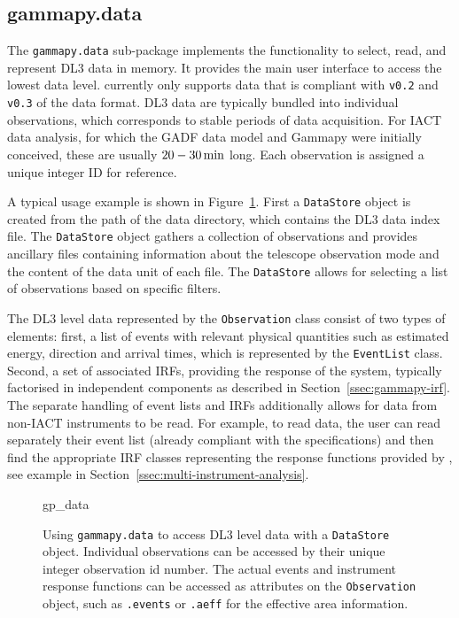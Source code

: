 \documentclass[traditabstract, longauth]{aa}
\newcommand{\code}[1]{\texttt{#1}}
\begin{document}
\subsection{gammapy.data}
\label{ssec:gammapy-data}
The \code{gammapy.data} sub-package implements the functionality to select,
read, and represent DL3 \gammaray data in memory. It provides the main user
interface to access the lowest data level. \gammapy currently only
supports data that is compliant with \code{v0.2} and \code{v0.3} of the \gadf data format.
DL3 data are typically bundled into individual observations, which
corresponds to stable periods of data acquisition. For IACT data analysis,
for which the GADF data model and Gammapy were initially conceived,
these are usually $20 - 30\,{\rm min}$ long.
Each observation is assigned a unique integer ID for reference.

A typical usage example is shown in Figure~\ref{fig*:minted:gp_data}.
First a \code{DataStore} object is created from the path of the data
directory, which contains the DL3 data index file. The \code{DataStore}
object gathers a collection of observations and provides ancillary
files containing information about the telescope observation mode and the
content of the data unit of each file. The \code{DataStore} allows for
selecting a list of observations based on specific filters.

The DL3 level data represented by the \code{Observation} class consist
of two types of elements: first, a list of \gammaray events with relevant physical
quantities such as estimated energy, direction and arrival
times, which is represented by the \code{EventList} class. Second, a set of
associated IRFs, providing the response of the system, typically
factorised in independent components as described in
Section~\ref{ssec:gammapy-irf}. The separate handling of event lists and IRFs
additionally allows for data from non-IACT \gammaray instruments to be read. For
example, to read \fermi data, the user can read separately their event list
(already compliant with the \gadf specifications) and then find the appropriate
IRF classes representing the response functions provided by \fermi, see
example in Section~\ref{ssec:multi-instrument-analysis}.

\begin{figure}
	\small
	{gp_data}
	\caption{
        Using \code{gammapy.data} to access DL3 level data with a \code{DataStore} object.
        Individual observations can be accessed by their unique integer observation id number.
        The actual events and instrument response functions can be accessed
        as attributes on the \code{Observation} object, such as \code{.events}
        or \code{.aeff} for the effective area information.
    }
	\label{fig*:minted:gp_data}
\end{figure}
%
\end{document}
